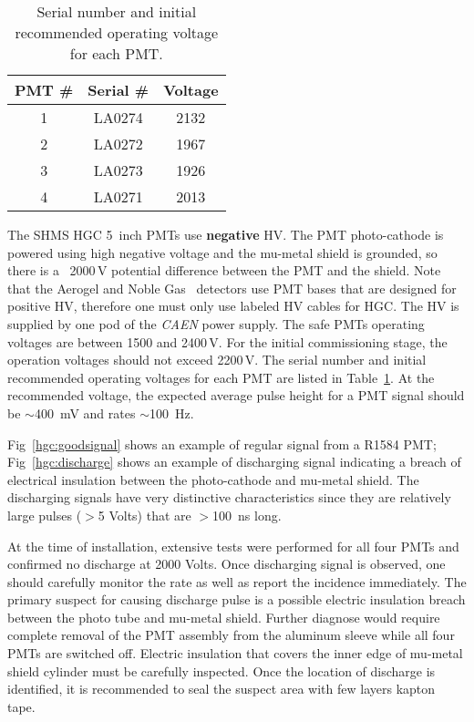 {%

\begin{table}[t]
\centering
  \begin{tabular}{ |c | c | c |}
    \hline
    PMT \#    & Serial \# & Voltage \\ \hline
    1         & LA0274    & 2132    \\ \hline
    2         & LA0272    & 1967    \\ \hline
    3         & LA0273    & 1926    \\ \hline
    4         & LA0271    & 2013    \\
    \hline
  \end{tabular}
  \caption{Serial number and initial recommended operating voltage for each PMT.} 
  \label{tab:hgc_volt}
\end{table}

The SHMS HGC 5~inch PMTs use {\bf negative} HV. The PMT photo-cathode
is powered using high negative voltage and the mu-metal shield
is grounded, so there is a ~2000\,V potential difference between the PMT
and the shield. Note that the Aerogel and Noble Gas \Cerenkov\
detectors use PMT bases that are designed for positive HV, therefore
one must only use labeled HV cables for HGC. The HV is supplied by
one pod of the {\em CAEN} power supply. The safe PMTs operating
voltages are between 1500 and 2400\,V. For the initial
commissioning stage, the operation voltages should not exceed 2200\,V.
The serial number and initial recommended operating voltages
for each PMT are listed in Table~\ref{tab:hgc_volt}. At the
recommended voltage, the expected average pulse height for a PMT
signal should be $\sim$400~mV and rates $\sim$100~Hz.


Fig~\ref{hgc:goodsignal} shows an example of regular signal from a
R1584 PMT; Fig~\ref{hgc:discharge} shows an example of discharging
signal indicating a breach of electrical insulation between the
photo-cathode and mu-metal shield. The discharging signals have very
distinctive characteristics since they are relatively large pulses
($>$5 Volts) that are $>$100~ns long.

At the time of installation, extensive tests were performed for all
four PMTs and confirmed no discharge at 2000 Volts. Once discharging
signal is observed, one should carefully monitor the rate as well as
report the incidence immediately. The primary suspect for causing
discharge pulse is a possible electric insulation breach between the
photo tube and mu-metal shield. Further diagnose would require
complete removal of the PMT assembly from the aluminum sleeve while
all four PMTs are switched off. Electric insulation that covers the
inner edge of mu-metal shield cylinder must be carefully
inspected. Once the location of discharge is identified, it is
recommended to seal the suspect area with few layers kapton tape.


}
